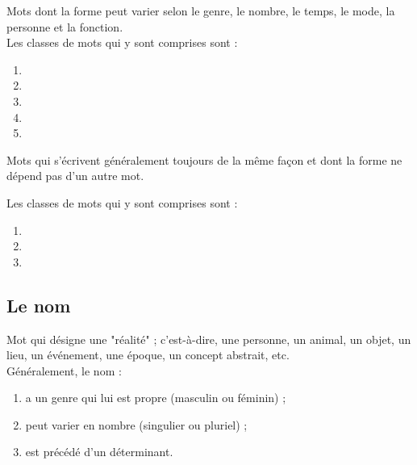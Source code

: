 \documentclass[10pt, french]{article}
\begin{document}
\begin{multicols*}{2}
\begin{definitionNOHFILLsub}
Mots dont la forme peut varier selon le genre, le nombre, le temps, le mode, la personne et la fonction.\\

Les classes de mots qui y sont comprises sont :
\begin{enumerate}
	\item	{}
	\item	{}
	\item	{}
	\item	{}
	\item	{}
\end{enumerate}
\end{definitionNOHFILLsub}

\begin{definitionNOHFILLsub}
Mots qui s'écrivent généralement toujours de la même façon et dont la forme ne dépend pas d'un autre mot.

Les classes de mots qui y sont comprises sont :
\begin{enumerate}
	\item	{}
	\item	{}
	\item	{}
\end{enumerate}
\end{definitionNOHFILLsub}


\columnbreak
\subsection{Le nom}\label{sec:classes-nom}
\begin{definitionNOHFILL}[Le nom]
Mot qui désigne une "réalité" ; c'est-à-dire, une personne, un animal, un objet, un lieu, un événement, une époque, un concept abstrait, etc.	\\

Généralement, le nom : 
\begin{enumerate}
	\item	a un genre qui lui est propre (masculin ou féminin) ;
	\item	peut varier en nombre (singulier ou pluriel) ;
	\item	est précédé d'un déterminant.
\end{enumerate}
\end{definitionNOHFILL}


\end{multicols*}
\end{document}
